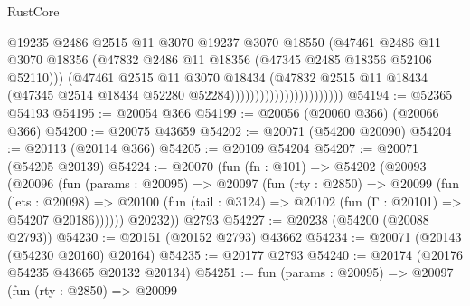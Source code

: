 \begin{lexlean}{RustCore}
\begin{coremodule}
                                            @19235
                                            @2486
                                            @2515
                                            @11
                                            @3070
                                            @19237
                                            @3070
                                            @18550
                                            (@47461
                                              @2486
                                              @11
                                              @3070
                                              @18356
                                              (@47832
                                                @2486
                                                @11
                                                @18356
                                                (@47345 @2485 @18356 @52106 @52110)))
                                            (@47461
                                              @2515
                                              @11
                                              @3070
                                              @18434
                                              (@47832
                                                @2515
                                                @11
                                                @18434
                                                (@47345
                                                  @2514
                                                  @18434
                                                  @52280
                                                  @52284)))))))))))))))))))))))
@54194 := @52365 @54193
@54195 := @20054 @366
@54199 := @20056 (@20060 @366) (@20066 @366)
@54200 := @20075 @43659
@54202 := @20071 (@54200 @20090)
@54204 := @20113 (@20114 @366)
@54205 := @20109 @54204
@54207 := @20071 (@54205 @20139)
@54224 := @20070
    (fun (fn : @101) =>
    @54202
      (@20093
        (@20096
          (fun (params : @20095) =>
          @20097
            (fun (rty : @2850) =>
            @20099
              (fun (lets : @20098) =>
              @20100 (fun (tail : @3124) => @20102 (fun (Γ : @20101) => @54207 @20186))))))
        @20232))
    @2793
@54227 := @20238 (@54200 (@20088 @2793))
@54230 := @20151 (@20152 @2793) @43662
@54234 := @20071 (@20143 (@54230 @20160) @20164)
@54235 := @20177 @2793
@54240 := @20174 (@20176 @54235 @43665 @20132 @20134)
@54251 := fun (params : @20095) =>
  @20097
    (fun (rty : @2850) =>
    @20099

\end{coremodule}
\end{lexlean}
